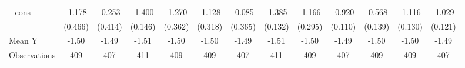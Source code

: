 {\begin{tabular}{l*{12}{c}}
\addlinespace
\_cons      &      -1.178\sym{**} &      -0.253         &      -1.400\sym{***}&      -1.270\sym{***}&      -1.128\sym{***}&      -0.085         &      -1.385\sym{***}&      -1.166\sym{***}&      -0.920\sym{***}&      -0.568\sym{***}&      -1.116\sym{***}&      -1.029\sym{***}\\
            &     (0.466)         &     (0.414)         &     (0.146)         &     (0.362)         &     (0.318)         &     (0.365)         &     (0.132)         &     (0.295)         &     (0.110)         &     (0.139)         &     (0.130)         &     (0.121)         \\
\midrule
Mean Y      &       -1.50         &       -1.49         &       -1.51         &       -1.50         &       -1.50         &       -1.49         &       -1.51         &       -1.50         &       -1.49         &       -1.50         &       -1.50         &       -1.49         \\
Observations&         409         &         407         &         411         &         409         &         409         &         407         &         411         &         409         &         407         &         409         &         409         &         407         \\
\bottomrule
\end{tabular}
}
